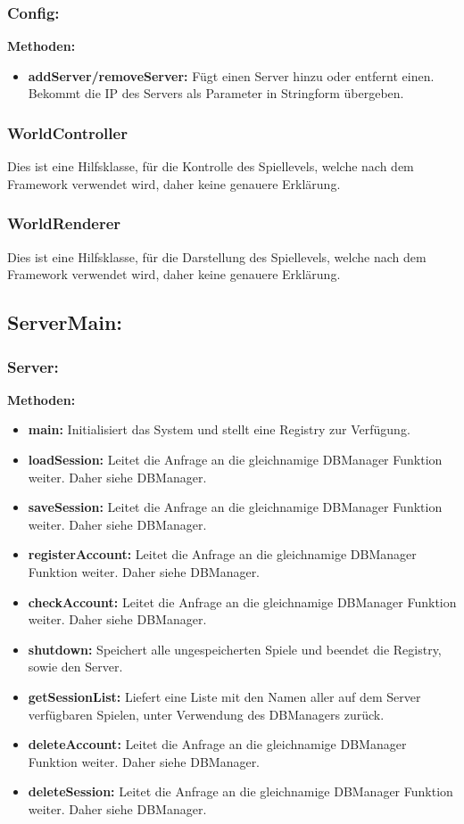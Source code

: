 \documentclass[fontsize=12pt,paper=a4,twoside]{scrartcl}
\begin{document}
\subsubsection{Config:}
\textbf{Methoden:}
\begin{itemize}
	\item \textbf{addServer/removeServer:} Fügt einen Server hinzu oder entfernt einen. Bekommt die IP des Servers als Parameter in Stringform übergeben.
\end{itemize}

\subsubsection{WorldController}

Dies ist eine Hilfsklasse, für die Kontrolle des Spiellevels, welche nach dem Framework verwendet wird, daher keine genauere Erklärung.

\subsubsection{WorldRenderer}

Dies ist eine Hilfsklasse, für die Darstellung des Spiellevels, welche nach dem Framework verwendet wird, daher keine genauere Erklärung.

\subsection{ServerMain:}
\subsubsection{Server:}
\textbf{Methoden:}
\begin{itemize}
	\item \textbf{main:} Initialisiert das System und stellt eine Registry zur Verfügung.
	\item \textbf{loadSession:} Leitet die Anfrage an die gleichnamige DBManager Funktion weiter. Daher siehe DBManager.
	\item \textbf{saveSession:} Leitet die Anfrage an die gleichnamige DBManager Funktion weiter. Daher siehe DBManager.
	\item \textbf{registerAccount:} Leitet die Anfrage an die gleichnamige DBManager Funktion weiter. Daher siehe DBManager.
	\item \textbf{checkAccount:} Leitet die Anfrage an die gleichnamige DBManager Funktion weiter. Daher siehe DBManager.
	\item \textbf{shutdown:} Speichert alle ungespeicherten Spiele und beendet die Registry, sowie den Server.
	\item \textbf{getSessionList:} Liefert eine Liste mit den Namen aller auf dem Server verfügbaren Spielen, unter Verwendung des DBManagers zurück.
	\item \textbf{deleteAccount:} Leitet die Anfrage an die gleichnamige DBManager Funktion weiter. Daher siehe DBManager.
	\item \textbf{deleteSession:} Leitet die Anfrage an die gleichnamige DBManager Funktion weiter. Daher siehe DBManager.
\end{itemize}
\end{document}
